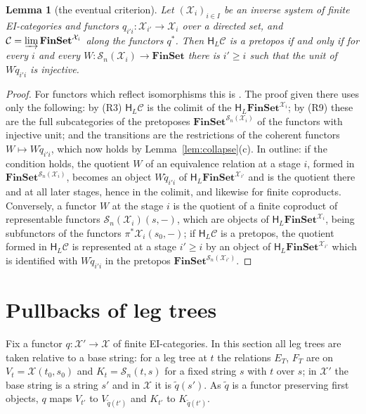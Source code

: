 \documentclass[11pt]{amsart}
\newtheorem{lem}[thm]{Lemma}
\theoremstyle{definition}
\newcommand{\Fin}{\mathbf{FinSet}}
\newcommand{\HH}{\mathsf H}
\newcommand{\cX}{\mathcal X}
\newcommand{\cC}{\mathcal C}
\newcommand{\cS}{\mathcal S}
\begin{document}
\begin{lem}[the eventual criterion]\label{lem:eventual}
Let $(\cX_i)_{i\in I}$ be an inverse system of finite EI-categories
and functors $q_{i'i}\colon\cX_{i'}\to\cX_i$ over a directed set, and
$\cC=\varinjlim\Fin^{\cX_i}$ along the functors $q^*$. Then $\HH_L\cC$
is a pretopos if and only if for every $i$ and every
$W\colon\cS_n(\cX_i)\to\Fin$ there is $i'\ge i$ such that the unit of
$W\tilde q_{i'i}$ is injective.
\end{lem}
\begin{proof}
For functors which reflect isomorphisms this is
\cite[Lemma~7.3]{Proftrees}. The proof given there uses only the
following: by (R3) $\HH_L\cC$ is the colimit of the
$\HH_L\Fin^{\cX_i}$; by (R9) these are the full subcategories of the
pretoposes $\Fin^{\cS_n(\cX_i)}$ of the functors with injective unit;
and the transitions are the restrictions of the coherent functors
$W\mapsto W\tilde q_{i'i}$, which now holds by
Lemma~\ref{lem:collapse}(c). In outline: if the condition holds, the
quotient $W$ of an equivalence relation at a stage $i$, formed in
$\Fin^{\cS_n(\cX_i)}$, becomes an object $W\tilde q_{i'i}$ of
$\HH_L\Fin^{\cX_{i'}}$ and is the quotient there and at all later
stages, hence in the colimit, and likewise for finite coproducts.
Conversely, a functor $W$ at the stage $i$ is the quotient of a finite
coproduct of representable functors $\cS_n(\cX_i)(s,-)$, which are
objects of $\HH_L\Fin^{\cX_i}$, being subfunctors of the functors
$\pi^*\cX_i(s_0,-)$; if $\HH_L\cC$ is a pretopos, the quotient formed
in $\HH_L\cC$ is represented at a stage $i'\ge i$ by an object of
$\HH_L\Fin^{\cX_{i'}}$ which is identified with $W\tilde q_{i'i}$ in
the pretopos $\Fin^{\cS_n(\cX_{i'})}$.
\end{proof}

\section{Pullbacks of leg trees}\label{sec:pull}

Fix a functor $q\colon\cX'\to\cX$ of finite EI-categories. In this
section all leg trees are taken relative to a base string: for a leg
tree at $t$ the relations $E_T$, $F_T$ are on $V_t=\cX(t_0,s_0)$ and
$K_t=\cS_n(t,s)$ for a fixed string $s$ with $t$ over $s$; in $\cX'$
the base string is a string $s'$ and in $\cX$ it is $\tilde q(s')$.
As $\tilde q$ is a functor preserving first objects, $q$ maps $V_{t'}$
to $V_{\tilde q(t')}$ and $K_{t'}$ to $K_{\tilde q(t')}$.
\end{document}
